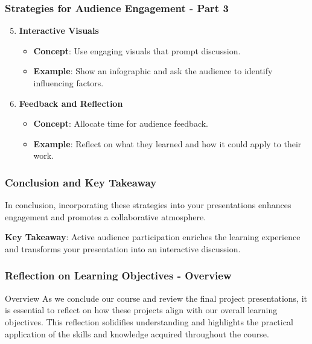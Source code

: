 \documentclass[aspectratio=169]{beamer}
\begin{document}
\begin{frame}[fragile]
    \frametitle{Strategies for Audience Engagement - Part 3}
    \begin{enumerate}
        \setcounter{enumi}{4}
        \item \textbf{Interactive Visuals}
            \begin{itemize}
                \item \textbf{Concept}: Use engaging visuals that prompt discussion.
                \item \textbf{Example}: Show an infographic and ask the audience to identify influencing factors.
            \end{itemize}
        \item \textbf{Feedback and Reflection}
            \begin{itemize}
                \item \textbf{Concept}: Allocate time for audience feedback.
                \item \textbf{Example}: Reflect on what they learned and how it could apply to their work.
            \end{itemize}
    \end{enumerate}
\end{frame}

\begin{frame}[fragile]
    \frametitle{Conclusion and Key Takeaway}
    In conclusion, incorporating these strategies into your presentations enhances engagement and promotes a collaborative atmosphere.

    \textbf{Key Takeaway}: Active audience participation enriches the learning experience and transforms your presentation into an interactive discussion.
\end{frame}

\begin{frame}[fragile]
    \frametitle{Reflection on Learning Objectives - Overview}
    \begin{block}{Overview}
        As we conclude our course and review the final project presentations, it is essential to reflect on how these projects align with our overall learning objectives. This reflection solidifies understanding and highlights the practical application of the skills and knowledge acquired throughout the course.
    \end{block}
\end{frame}
\end{document}
